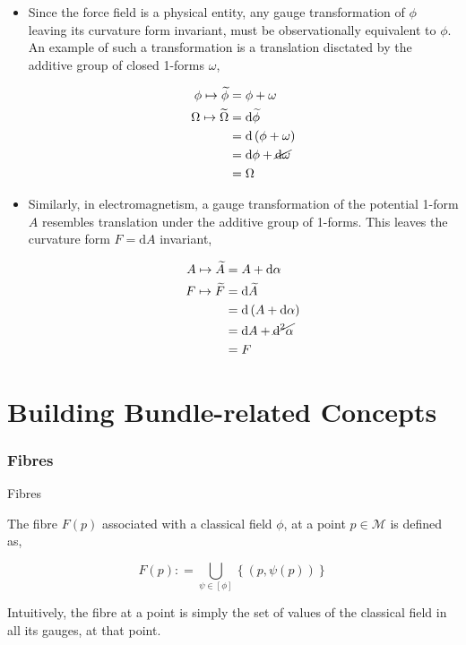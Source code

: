 \documentclass[9pt,handout]{beamer}
\begin{document}
\begin{frame}{}
\begin{itemize}
\item Since the force field is a physical entity, any gauge transformation of $\phi$ leaving its curvature form invariant, must be observationally equivalent to $\phi$. An example of such a transformation is a translation disctated by the additive group of closed 1-forms $\omega$,

\begin{align*}
\phi \mapsto \widetilde{\phi} & = \phi + \omega \\
\Omega \mapsto \widetilde{\Omega} & = \text{d} \widetilde{\phi} \\
& = \text{d} \left( \phi + \omega \right) \\
& = \text{d}\phi + \cancel{\text{d}\omega} \\
& = \Omega
\end{align*}

\item Similarly, in electromagnetism, a gauge transformation of the potential 1-form $A$ resembles translation under the additive group of 1-forms. This leaves the curvature form $F = \text{d}A$ invariant,

\begin{align*}
A \mapsto \widetilde{A} & = A + \text{d} \alpha \\
F \mapsto \widetilde{F} & = \text{d} \widetilde{A} \\
& = \text{d} \left( A + \text{d}\alpha \right) \\
& = \text{d}A + \cancel{\text{d}^2 \alpha} \\
& = F
\end{align*}
\end{itemize}
\end{frame}

\section{Building Bundle-related Concepts}

\subsubsection{Fibres}
\begin{frame}{Fibres}
\begin{definition}[Fibre]
The fibre $F \left( p \right)$ associated with a classical field $\phi$, at a point $p \in \mathcal{M}$ is defined as,

$$F \left( p \right) : = \bigcup_{\psi \in \left[ \phi \right]} \left\{ \left( p, \psi \left( p \right) \right) \right\}$$
\end{definition}   

Intuitively, the fibre at a point is simply the set of values of the classical field in all its gauges, at that point. 
\end{frame}
\end{document}
